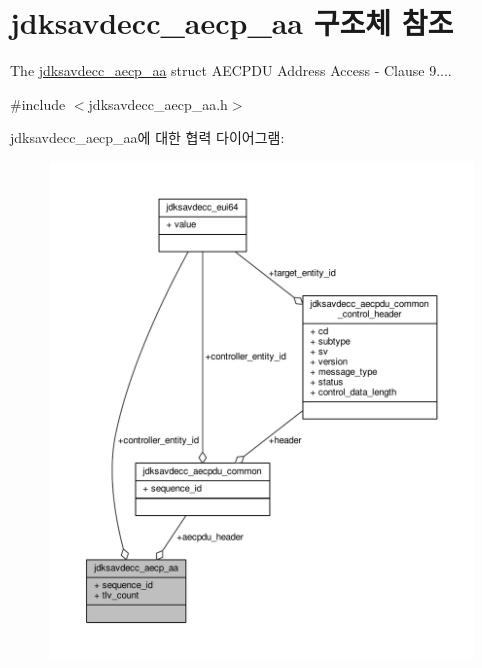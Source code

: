 \hypertarget{structjdksavdecc__aecp__aa}{}\section{jdksavdecc\+\_\+aecp\+\_\+aa 구조체 참조}
\label{structjdksavdecc__aecp__aa}


The \hyperlink{structjdksavdecc__aecp__aa}{jdksavdecc\+\_\+aecp\+\_\+aa} struct A\+E\+C\+P\+DU Address Access -\/ Clause 9....  




{\ttfamily \#include $<$jdksavdecc\+\_\+aecp\+\_\+aa.\+h$>$}



jdksavdecc\+\_\+aecp\+\_\+aa에 대한 협력 다이어그램\+:
\nopagebreak
\begin{figure}[H]
\begin{center}
\leavevmode
\includegraphics[width=350pt]{structjdksavdecc__aecp__aa__coll__graph}
\end{center}
\end{figure}
